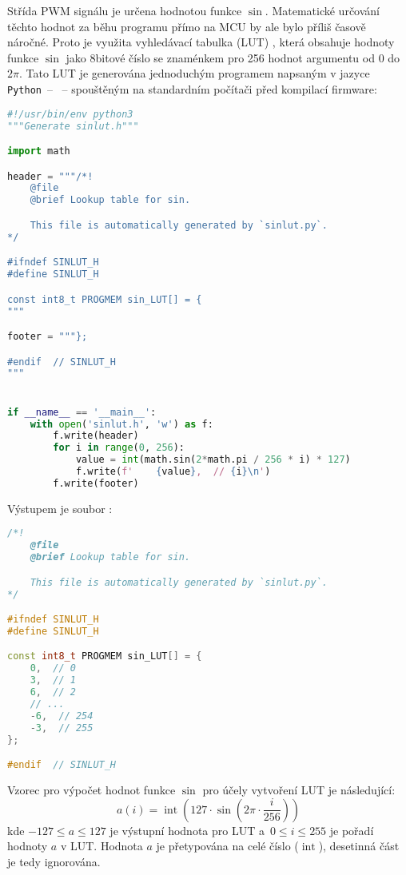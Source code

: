 Střída PWM signálu je určena hodnotou funkce $\sin$. Matematické určování
těchto hodnot za běhu programu přímo na MCU by ale bylo příliš časově náročné.
Proto je využita vyhledávací tabulka (LUT) , která obsahuje
hodnoty funkce $\sin$ jako 8bitové číslo se znaménkem pro 256 hodnot argumentu
od $0$ do $2\pi$. Tato LUT je generována jednoduchým programem napsaným
v jazyce \texttt{Python}~-- ~-- spouštěným na standardním
počítači před kompilací firmware:
\begin{lstlisting}[language=Python,style=numbers]
#!/usr/bin/env python3
"""Generate sinlut.h"""

import math

header = """/*!
    @file
    @brief Lookup table for sin.

    This file is automatically generated by `sinlut.py`.
*/

#ifndef SINLUT_H
#define SINLUT_H

const int8_t PROGMEM sin_LUT[] = {
"""

footer = """};

#endif  // SINLUT_H
"""


if __name__ == '__main__':
    with open('sinlut.h', 'w') as f:
        f.write(header)
        for i in range(0, 256):
            value = int(math.sin(2*math.pi / 256 * i) * 127)
            f.write(f'    {value},  // {i}\n')
        f.write(footer)
\end{lstlisting}

Výstupem je soubor :
\begin{lstlisting}[language=C++,style=numbers]
/*!
    @file
    @brief Lookup table for sin.

    This file is automatically generated by `sinlut.py`.
*/

#ifndef SINLUT_H
#define SINLUT_H

const int8_t PROGMEM sin_LUT[] = {
    0,  // 0
    3,  // 1
    6,  // 2
    // ...
    -6,  // 254
    -3,  // 255
};

#endif  // SINLUT_H
\end{lstlisting}

Vzorec pro výpočet hodnot funkce $\sin$ pro účely vytvoření LUT je následující:
\begin{equation}
    a(i) = \operatorname{int}\left( \num{127}\cdot\sin{\left(2\pi \cdot \frac{i}{256}\right)} \right)
\end{equation}
kde $\num{-127} \le a \le \num{127}$ je výstupní hodnota pro LUT
a~$\num{0} \le i \le \num{255}$ je pořadí hodnoty $a$ v LUT. Hodnota $a$ je
přetypována na celé číslo ($\operatorname{int}$), desetinná část je tedy
ignorována.

